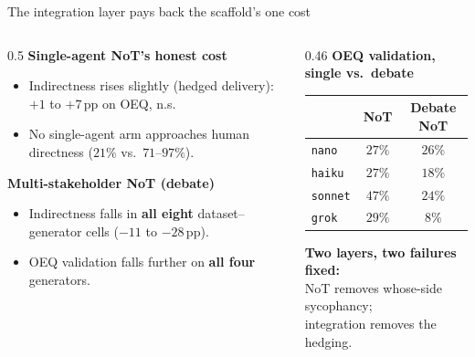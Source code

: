 \documentclass[11pt,aspectratio=169]{beamer}
\newcommand{\good}[1]{\textcolor{ncottealdk}{\textbf{#1}}}
\begin{document}
\begin{frame}{The integration layer pays back the scaffold's one cost}
\begin{columns}[T]
\begin{column}{0.5\textwidth}
\textbf{Single-agent NoT's honest cost}
\begin{itemize}
  \item Indirectness rises slightly (hedged delivery): $+1$ to $+7$\,pp on OEQ, n.s.
  \item No single-agent arm approaches human directness ($21\%$ vs.\ $71$--$97\%$).
\end{itemize}
\medskip
\textbf{Multi-stakeholder NoT (debate)}
\begin{itemize}
  \item Indirectness falls in \good{all eight} dataset--generator cells ($-11$ to $-28$\,pp).
  \item OEQ validation falls further on \good{all four} generators.
\end{itemize}
\end{column}
\begin{column}{0.46\textwidth}
\textbf{OEQ validation, single vs.\ debate}
\medskip

\begin{tabular}{lcc}
\toprule
 & NoT & Debate NoT \\
\midrule
\texttt{nano}   & $27\%$ & $26\%$ \\
\texttt{haiku}  & $27\%$ & \good{$18\%$} \\
\texttt{sonnet} & $47\%$ & \good{$24\%$} \\
\texttt{grok}   & $29\%$ & \good{$8\%$} \\
\bottomrule
\end{tabular}

\bigskip
\good{Two layers, two failures fixed:}\\
NoT removes whose-side sycophancy;\\
integration removes the hedging.
\end{column}
\end{columns}
\end{frame}
\end{document}
